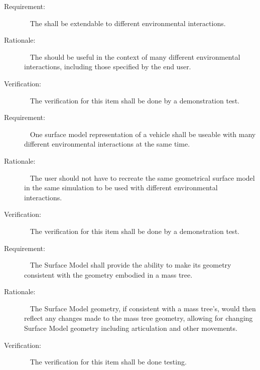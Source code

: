  \label{reqt:surfacemodel_interaction_extension}
 \begin{description}
 \item[Requirement:]\ \newline
 The \ModelDesc shall be extendable to different environmental
 interactions.
 \item[Rationale:]\ \newline
 The \ModelDesc should be useful in the context of many different
 environmental interactions, including those specified by the end user.
 \item[Verification:]\ \newline
 The verification for this item shall be done by a demonstration test.
 \end{description}
 
 \label{reqt:surfacemodel_surface_reuse}
 \begin{description}
 \item[Requirement:]\ \newline
 One surface model representation of a vehicle shall be useable with
 many different environmental interactions at the same time.
 \item[Rationale:]\ \newline
 The user should not have to recreate the same geometrical surface model
 in the same simulation to be used with different environmental
 interactions.
 \item[Verification:]\ \newline
 The verification for this item shall be done by a demonstration test.
 \end{description}

 \label{reqt:surfacemodel_artic}
 \begin{description}
 \item[Requirement:]\ \newline
 The Surface Model shall provide the ability to make its
geometry consistent with the geometry embodied in a mass tree.
 \item[Rationale:]\ \newline
 The Surface Model geometry, if consistent with a mass tree's, would then
 reflect any changes made to the mass tree geometry, allowing for
 changing Surface Model geometry including articulation and other
 movements.
 \item[Verification:]\ \newline
 The verification for this item shall be done testing.
 \end{description}

